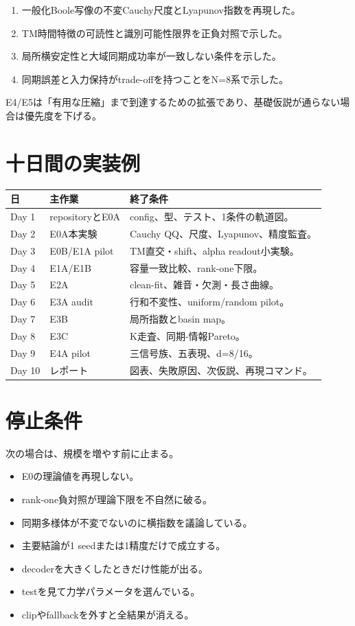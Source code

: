 \documentclass[a4paper,11pt,oneside,openany]{ltjsbook}
\begin{document}
\begin{enumerate}
  \item 一般化Boole写像の不変Cauchy尺度とLyapunov指数を再現した。
  \item TM時間特徴の可読性と識別可能性限界を正負対照で示した。
  \item 局所横安定性と大域同期成功率が一致しない条件を示した。
  \item 同期誤差と入力保持がtrade-offを持つことをN=8系で示した。
\end{enumerate}

E4/E5は「有用な圧縮」まで到達するための拡張であり、基礎仮説が通らない場合は優先度を下げる。

\section{十日間の実装例}

\begin{longtable}{p{15mm}p{37mm}p{88mm}}
\toprule
日 & 主作業 & 終了条件 \\
\midrule
Day 1 & repositoryとE0A & config、型、テスト、1条件の軌道図。\\
Day 2 & E0A本実験 & Cauchy QQ、尺度、Lyapunov、精度監査。\\
Day 3 & E0B/E1A pilot & TM直交・shift、alpha readout小実験。\\
Day 4 & E1A/E1B & 容量一致比較、rank-one下限。\\
Day 5 & E2A & clean-fit、雑音・欠測・長さ曲線。\\
Day 6 & E3A audit & 行和不変性、uniform/random pilot。\\
Day 7 & E3B & 局所指数とbasin map。\\
Day 8 & E3C & K走査、同期-情報Pareto。\\
Day 9 & E4A pilot & 三信号族、五表現、d=8/16。\\
Day 10 & レポート & 図表、失敗原因、次仮説、再現コマンド。\\
\bottomrule
\end{longtable}

\section{停止条件}

次の場合は、規模を増やす前に止まる。

\begin{itemize}
  \item E0の理論値を再現しない。
  \item rank-one負対照が理論下限を不自然に破る。
  \item 同期多様体が不変でないのに横指数を議論している。
  \item 主要結論が1 seedまたは1精度だけで成立する。
  \item decoderを大きくしたときだけ性能が出る。
  \item testを見て力学パラメータを選んでいる。
  \item clipやfallbackを外すと全結果が消える。
\end{itemize}
\end{document}
